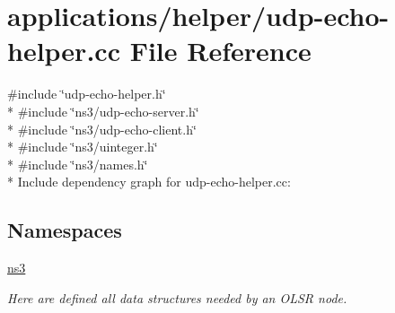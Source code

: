 \hypertarget{udp-echo-helper_8cc}{}\section{applications/helper/udp-\/echo-\/helper.cc File Reference}
\label{udp-echo-helper_8cc}
{\ttfamily \#include \char`\"{}udp-\/echo-\/helper.\+h\char`\"{}}\\*
{\ttfamily \#include \char`\"{}ns3/udp-\/echo-\/server.\+h\char`\"{}}\\*
{\ttfamily \#include \char`\"{}ns3/udp-\/echo-\/client.\+h\char`\"{}}\\*
{\ttfamily \#include \char`\"{}ns3/uinteger.\+h\char`\"{}}\\*
{\ttfamily \#include \char`\"{}ns3/names.\+h\char`\"{}}\\*
Include dependency graph for udp-\/echo-\/helper.cc\+:
\subsection*{Namespaces}
\begin{DoxyCompactItemize}
\item 
 \hyperlink{namespacens3}{ns3}
\begin{DoxyCompactList}\small\item\em Here are defined all data structures needed by an O\+L\+SR node. \end{DoxyCompactList}\end{DoxyCompactItemize}
